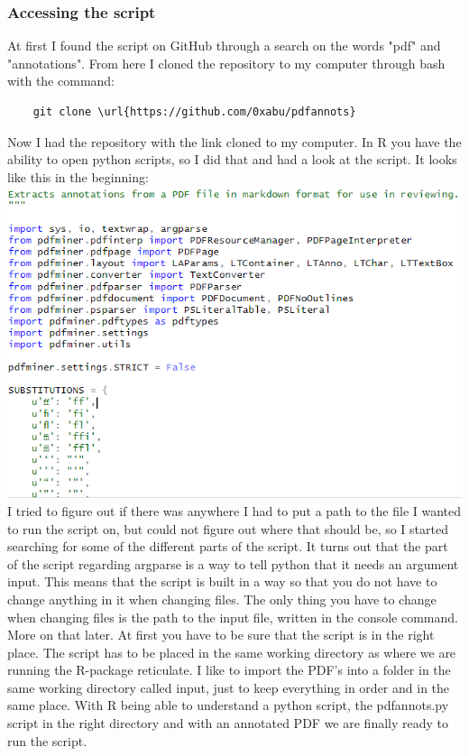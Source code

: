\documentclass{article}
\begin{document}
\subsubsection{Accessing the script}
At first I found the script on GitHub through a search on the words "pdf" and "annotations". From here I cloned the repository to my computer through bash with the command:
\begin{verbatim}
    git clone \url{https://github.com/0xabu/pdfannots}
\end{verbatim}
Now I had the repository with the link cloned to my computer. In R you have the ability to open python scripts, so I did that and had a look at the script. It looks like this in the beginning: \newline
\includegraphics[scale=0.85]{part_of_pdfannotspy.PNG} \newline
I tried to figure out if there was anywhere I had to put a path to the file I wanted to run the script on, but could not figure out where that should be, so I started searching for some of the different parts of the script. It turns out that the part of the script regarding argparse is a way to tell python that it needs an argument input. This means that the script is built in a way so that you do not have to change anything in it when changing files. The only thing you have to change when changing files is the path to the input file, written in the console command. More on that later. At first you have to be sure that the script is in the right place. The script has to be placed in the same working directory as where we are running the R-package reticulate. I like to import the PDF's into a folder in the same working directory called input, just to keep everything in order and in the same place. \newline
With R being able to understand a python script, the pdfannots.py script in the right directory and with an annotated PDF we are finally ready to run the script.
\end{document}
